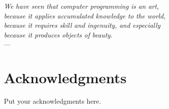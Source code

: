 %


\begin{flushright}
\textsl{We have seen that computer programming is an art, }\\
\textsl{ because it applies accumulated knowledge to the world,
}\\
\textsl{ because it requires skill and ingenuity, and especially
}\\
\textsl{ because it produces objects of beauty.} \\
 \medskip{}
 --- 
\citep{knuth:1974} 
\par\end{flushright}

\bigskip{}


\begingroup 


\chapter*{Acknowledgments}

Put your acknowledgments here.



\endgroup{}

